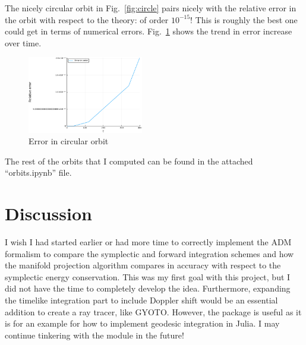 \documentclass[%
preprint,
onecolumn,
amsmath,amssymb,
aps,
]{revtex4-1}
\numberwithin{equation}{section}
\begin{document}
    The nicely circular orbit in Fig.~\ref{fig:circle} pairs nicely with the relative error in the orbit with respect to the theory: of order $10^{-15}$! This is roughly the best one could get in terms of numerical errors. Fig.~\ref{fig:circleerr} shows the trend in error increase over time.

    \begin{figure}[h!]
        \centering
        \includegraphics[width=0.45\textwidth]{images/circleorberr.png}
        \caption{Error in circular orbit}
        \label{fig:circleerr}
    \end{figure}

    The rest of the orbits that I computed can be found in the attached ``orbits.ipynb'' file.

    \section{\label{sec:discussion} Discussion}

    I wish I had started earlier or had more time to correctly implement the ADM formalism to compare the symplectic and forward integration schemes and how the manifold projection algorithm compares in accuracy with respect to the symplectic energy conservation. This was my first goal with this project, but I did not have the time to completely develop the idea. Furthermore, expanding the timelike integration part to include Doppler shift would be an essential addition to create a ray tracer, like GYOTO.\cite{GYOTO2011} However, the package is useful as it is for an example for how to implement geodesic integration in Julia. I may continue tinkering with the module in the future!

    
    
\end{document}
